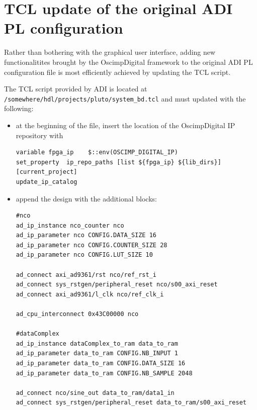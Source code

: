 \documentclass[12pt,oneside]{article}
\begin{document}
\section{TCL update of the original ADI PL configuration}

Rather than bothering with the graphical user interface, adding new functionalitites
brought by the OscimpDigital framework to the original ADI PL configuration file is most
efficiently achieved by updating the TCL script.

The TCL script provided by ADI is located at {\tt /somewhere/hdl/projects/pluto/system\_bd.tcl} and
must updated with the following:
\begin{itemize}
\item at the beginning of the file, insert the location of the OscimpDigital IP repository with
{\footnotesize
\begin{verbatim}
variable fpga_ip    $::env(OSCIMP_DIGITAL_IP)
set_property  ip_repo_paths [list ${fpga_ip} ${lib_dirs}] [current_project]
update_ip_catalog
\end{verbatim}
}
\item append the design with the additional blocks:
{\footnotesize
\begin{verbatim}
#nco
ad_ip_instance nco_counter nco
ad_ip_parameter nco CONFIG.DATA_SIZE 16
ad_ip_parameter nco CONFIG.COUNTER_SIZE 28
ad_ip_parameter nco CONFIG.LUT_SIZE 10

ad_connect axi_ad9361/rst nco/ref_rst_i
ad_connect sys_rstgen/peripheral_reset nco/s00_axi_reset
ad_connect axi_ad9361/l_clk nco/ref_clk_i

ad_cpu_interconnect 0x43C00000 nco

#dataComplex
ad_ip_instance dataComplex_to_ram data_to_ram
ad_ip_parameter data_to_ram CONFIG.NB_INPUT 1
ad_ip_parameter data_to_ram CONFIG.DATA_SIZE 16
ad_ip_parameter data_to_ram CONFIG.NB_SAMPLE 2048

ad_connect nco/sine_out data_to_ram/data1_in
ad_connect sys_rstgen/peripheral_reset data_to_ram/s00_axi_reset


\end{verbatim}}
\end{itemize}
\end{document}
